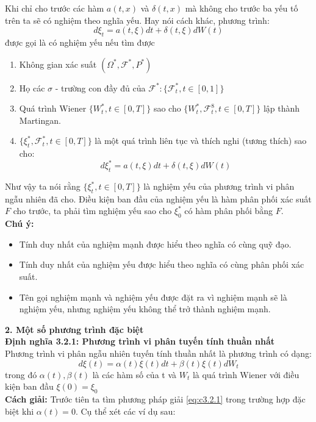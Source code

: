 \documentclass[12pt,a4paper]{article}
\begin{document}
Khi chỉ cho trước các hàm $a(t,x)$ và $\delta(t,x)$ mà không cho trước ba yếu tố trên ta sẽ có nghiệm theo nghĩa yếu. Hay nói cách khác, phương trình:
\begin{equation*}
	d\xi_t=a(t,\xi)dt+\delta(t,\xi)dW(t)
\end{equation*}
được gọi là có nghiệm yếu nếu tìm được
\begin{enumerate}[(1*)]
	\item Không gian xác suất $(\Omega^*,\mathscr{F}^*,P^*)$
	\item Họ các $\sigma$ - trường con đầy đủ của $\mathscr{F}^*:\{\mathscr{F}^*_t,t\in[0,1]\}$
	\item Quá trình Wiener $\{W_t^*,t\in[0,T]\}$ sao cho $\{W_t^*,\mathscr{F}^8_t,t\in[0,T]\}$ lập thành Martingan.
	\item $\{\xi_t^*,\mathscr{F}_t^*,t\in[0,T]\}$ là một quá trình liên tục và thích nghi (tương thích) sao cho:
	\begin{equation*}
		d\xi_t^*=a(t,\xi)dt+\delta(t,\xi)dW(t)	
	\end{equation*}
\end{enumerate}
Như vậy ta nói rằng $\{\xi_t^*,t\in[0,T]\}$ là nghiệm yếu của phương trình vi phân ngẫu nhiên đã cho. Điều kiện ban đầu của nghiệm yếu là hàm phân phối xác suất $F$ cho trước, ta phải tìm nghiệm yếu sao cho $\xi_0^*$ có hàm phân phối bằng $F$.\\
\textbf{Chú ý:}
\begin{itemize}[*]
	\item Tính duy nhất của nghiệm mạnh được hiểu theo nghĩa có cùng quỹ đạo.
	\item Tính duy nhất của nghiệm yếu được hiểu theo nghĩa có cùng phân phối xác suất.
	\item Tên gọi nghiệm mạnh và nghiệm yếu được đặt ra vì nghiệm mạnh sẽ là nghiệm yếu, nhưng nghiệm yếu không thể trở thành nghiệm mạnh.
\end{itemize}
\textbf{2. Một số phương trình đặc biệt}\\
\textbf{Định nghĩa 3.2.1: Phương trình vi phân tuyến tính thuần nhất}\\
Phương trình vi phân ngẫu nhiên tuyến tính thuần nhất là phương trình có dạng:
\begin{equation}\label{eq:c3.2.1}
	d\xi(t)=\alpha(t)\xi(t)dt+\beta(t)\xi(t)dW_t
\end{equation} 
trong đó $\alpha(t),\beta(t)$ là các hàm số của t và $W_t$ là quá trình Wiener với điều kiện ban đầu $\xi(0)=\xi_0$\\
\textbf{Cách giải:} Trước tiên ta tìm phương pháp giải \eqref{eq:c3.2.1} trong trường hợp đặc biệt khi $\alpha(t)=0$. Cụ thể xét các ví dụ sau:\\
\end{document}
